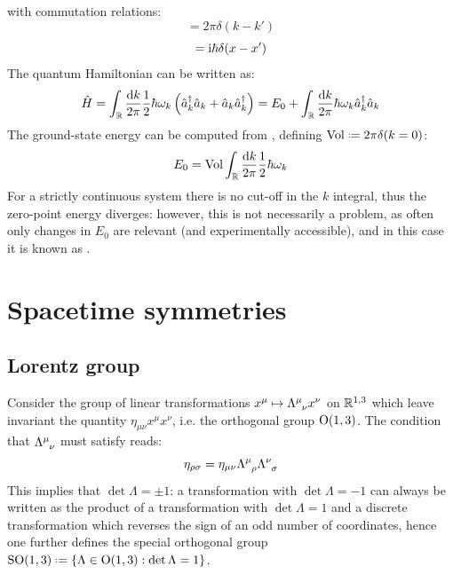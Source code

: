 with commutation relations:
\begin{equation}
  [\hat{a}_k, \hat{a}_{k'}^\dagger] = 2\pi \delta(k - k')
\end{equation}
\begin{equation}
  [\hat\phi(x,t), \hat\Pi(x',t)] = \img \hbar \delta(x - x')
\end{equation}
The quantum Hamiltonian can be written as:
\begin{equation}
  \hat{H} = \int_{\mathbb{R}} \frac{\mathrm{d} k}{2\pi} \frac{1}{2} \hbar \omega_k \left( \hat{a}_k^\dagger \hat{a}_k + \hat{a}_k \hat{a}_k^\dagger \right) = E_0 + \int_{\mathbb{R}} \frac{\mathrm{d} k}{2\pi} \hbar \omega_k \hat{a}_k^\dagger \hat{a}_k
\end{equation}
The ground-state energy can be computed from , defining $ \mathrm{Vol} \defeq 2\pi \delta(k = 0) $:
\begin{equation}
  E_0 = \mathrm{Vol} \int_{\mathbb{R}} \frac{\mathrm{d} k}{2\pi} \frac{1}{2} \hbar \omega_k
\end{equation}
For a strictly continuous system there is no cut-off in the $ k $ integral, thus the zero-point energy diverges: however, this is not necessarily a problem, as often only changes in $ E_0 $ are relevant (and experimentally accessible), and in this case it is known as .

\newpage
\section{Spacetime symmetries}

\subsection{Lorentz group}

Consider the group of linear transformations $ x^\mu \mapsto \tensor{\Lambda}{^\mu_\nu} x^\nu $ on $ \mathbb{R}^{1,3} $ which leave invariant the quantity $ \eta_{\mu \nu} x^\mu x^\nu $, i.e. the orthogonal group $ \mathrm{O}(1,3) $. The condition that $ \tensor{\Lambda}{^\mu_\nu} $ must satisfy reads:
\begin{equation}
  \eta_{\rho \sigma} = \eta_{\mu \nu} \tensor{\Lambda}{^\mu_\rho} \tensor{\Lambda}{^\nu_\sigma}
  \label{eq:lor-def}
\end{equation}
This implies that $ \det \Lambda = \pm 1 $: a transformation with $ \det \Lambda = -1 $ can always be written as the product of a transformation with $ \det \Lambda = 1 $ and a discrete transformation which reverses the sign of an odd number of coordinates, hence one further defines the special orthogonal group $ \SOn{1,3} \defeq \{\Lambda \in \On{1,3} : \det \Lambda = 1\} $.

